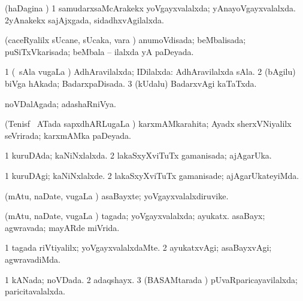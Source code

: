 \bentry
{} 
\gl{\gu}
\expl{}
\bmng
(haDagina \vi) 
\bnum
\num{1} samudarxsaMcArakekx yoVgayxvalalxda; yAnayoVgayxvalalxda. 
\num{2}yAnakekx sajAjxgada, sidadhxvAgilalxda. 
\enum
\emng
\eentry

\bentry
{} 
\gl{\gu}
\expl{}
\bmng
(caceRyalilx sUcane, sUcaka, \mo vara \vi) anumoVdisada; beMbalisada; puSiTxVkarisada; beMbala -- ilalxda yA paDeyada. 
\emng
\eentry

\bentry
{} 
\gl{\gu}
\expl{}
\bmng
\bnum
\num{1} (\kanmu\ sAla \mo vugaLa \vi) AdhAravilalxda; IDilalxda:  AdhAravilalxda sAla. 
\num{2} (bAgilu) biVga hAkada; BadarxpaDisada. 
\num{3} (kUdalu) BadarxvAgi kaTaTxda. 
\enum
\emng
\eentry

\bentry
{} 
\gl{\gu}
\expl{}
\bmng
noVDalAgada; adashaRniVya. 
\emng
\eentry

\bentry
{} 
\gl{\gu}
\expl{}
\bmng
(Tenisf \mo\ ATada sapxdhARLugaLa \vi) karxmAMkarahita; Ayadx sherxVNiyalilx seVrirada; karxmAMka paDeyada. 
\emng
\eentry

\bentry
{} 
\gl{\gu}
\expl{}
\bmng
\bnum
\num{1} kuruDAda; kaNiNxlalxda. 
\num{2} lakaSxyXviTuTx gamanisada; ajAgarUka. 
\enum
\emng
\eentry

\bentry
{} 
\gl{\kirxvi}
\expl{}
\bmng
\bnum
\num{1} kuruDAgi; kaNiNxlalxde. 
\num{2} lakaSxyXviTuTx gamanisade; ajAgarUkateyiMda. 
\enum
\emng
\eentry

\bentry
{} 
\gl{\nA}
\expl{}
\bmng
(mAtu, naDate, \mo vugaLa \vi) asaBayxte; yoVgayxvalalxdiruvike. 
\emng
\eentry

\bentry
{} 
\gl{\gu}
\bmng
(mAtu, naDate, \mo vugaLa \vi) 
\banum
{} tagada; yoVgayxvalalxda; ayukatx. 
 asaBayx; agwravada; mayARde miVrida. 
\eanum
\emng
\eentry

\bentry
{} 
\gl{\kirxvi}
\expl{}
\bmng
\bnum
\num{1} tagada riVtiyalilx; yoVgayxvalalxdaMte. 
\num{2} ayukatxvAgi; asaBayxvAgi; agwravadiMda. 
\enum
\emng
\eentry

\bentry
{} 
\gl{\gu}
\expl{}
\bmng
\bnum
\num{1} kANada; noVDada. 
\num{2} adaqshayx. 
\num{3} (BASAMtarada \vi) pUvaRparicayavilalxda; paricitavalalxda. 
\enum
\emng
\eentry

